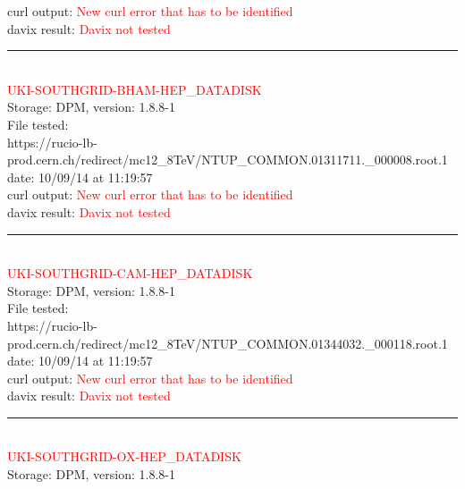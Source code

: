curl output:  \textcolor{red}{New curl error that has to be identified}\\

davix result:  \textcolor{red}{Davix not tested}\\

\rule{\textwidth}{1pt}\\

\textcolor{red}{\normalsize{UKI-SOUTHGRID-BHAM-HEP\_DATADISK}}\\

Storage: DPM, version: 1.8.8-1\\

File tested:\\
\footnotesize{https://rucio-lb-prod.cern.ch/redirect/mc12\_8TeV/NTUP\_COMMON.01311711.\_000008.root.1}\\

date: 10/09/14 at 11:19:57\\

curl output:  \textcolor{red}{New curl error that has to be identified}\\

davix result:  \textcolor{red}{Davix not tested}\\

\rule{\textwidth}{1pt}\\

\textcolor{red}{\normalsize{UKI-SOUTHGRID-CAM-HEP\_DATADISK}}\\

Storage: DPM, version: 1.8.8-1\\

File tested:\\
\footnotesize{https://rucio-lb-prod.cern.ch/redirect/mc12\_8TeV/NTUP\_COMMON.01344032.\_000118.root.1}\\

date: 10/09/14 at 11:19:57\\

curl output:  \textcolor{red}{New curl error that has to be identified}\\

davix result:  \textcolor{red}{Davix not tested}\\

\rule{\textwidth}{1pt}\\

\textcolor{red}{\normalsize{UKI-SOUTHGRID-OX-HEP\_DATADISK}}\\

Storage: DPM, version: 1.8.8-1\\

